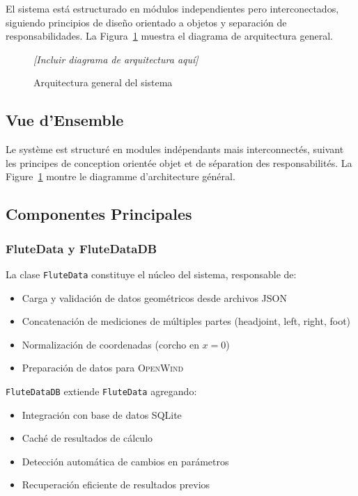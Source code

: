 \documentclass[12pt,a4paper,twocolumn]{article}
\newcommand{\openwind}{\textsc{OpenWind}}
\begin{document}
El sistema está estructurado en módulos independientes pero interconectados, siguiendo principios de diseño orientado a objetos y separación de responsabilidades. La Figura~\ref{fig:arquitectura} muestra el diagrama de arquitectura general.

\begin{figure}[H]
\centering
\caption{Arquitectura general del sistema}
\label{fig:arquitectura}
\textit{[Incluir diagrama de arquitectura aquí]}
\end{figure}

\subsection{Vue d'Ensemble}

Le système est structuré en modules indépendants mais interconnectés, suivant les principes de conception orientée objet et de séparation des responsabilités. La Figure~\ref{fig:arquitectura} montre le diagramme d'architecture général.

\subsection{Componentes Principales}

\subsubsection{FluteData y FluteDataDB}

La clase \texttt{FluteData} constituye el núcleo del sistema, responsable de:
\begin{itemize}
    \item Carga y validación de datos geométricos desde archivos JSON
    \item Concatenación de mediciones de múltiples partes (headjoint, left, right, foot)
    \item Normalización de coordenadas (corcho en $x=0$)
    \item Preparación de datos para \openwind{}
\end{itemize}

\texttt{FluteDataDB} extiende \texttt{FluteData} agregando:
\begin{itemize}
    \item Integración con base de datos SQLite
    \item Caché de resultados de cálculo
    \item Detección automática de cambios en parámetros
    \item Recuperación eficiente de resultados previos
\end{itemize}
\end{document}
